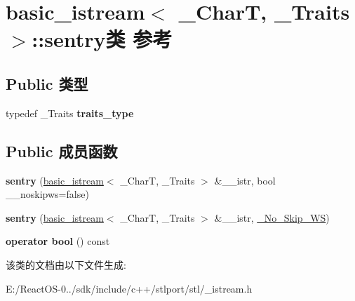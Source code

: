 \hypertarget{classbasic__istream_1_1sentry}{}\section{basic\+\_\+istream$<$ \+\_\+\+CharT, \+\_\+\+Traits $>$\+:\+:sentry类 参考}
\label{classbasic__istream_1_1sentry}
\subsection*{Public 类型}
\begin{DoxyCompactItemize}
\item 
\mbox{\label{classbasic__istream_1_1sentry_add21de8a23c3ec00ba2deb541eb53984}} 
typedef \+\_\+\+Traits {\bfseries traits\+\_\+type}
\end{DoxyCompactItemize}
\subsection*{Public 成员函数}
\begin{DoxyCompactItemize}
\item 
\mbox{\label{classbasic__istream_1_1sentry_a469ea3e67c901a6c3908ea6563baebe7}} 
{\bfseries sentry} (\hyperlink{classbasic__istream}{basic\+\_\+istream}$<$ \+\_\+\+CharT, \+\_\+\+Traits $>$ \&\+\_\+\+\_\+istr, bool \+\_\+\+\_\+noskipws=false)
\item 
\mbox{\label{classbasic__istream_1_1sentry_a5ec165167ee5a784d4d3c9c42df384f5}} 
{\bfseries sentry} (\hyperlink{classbasic__istream}{basic\+\_\+istream}$<$ \+\_\+\+CharT, \+\_\+\+Traits $>$ \&\+\_\+\+\_\+istr, \hyperlink{struct___no___skip___w_s}{\+\_\+\+No\+\_\+\+Skip\+\_\+\+WS})
\item 
\mbox{\label{classbasic__istream_1_1sentry_a80ad1e05f4815b5dc7a2abd9b0a11143}} 
{\bfseries operator bool} () const
\end{DoxyCompactItemize}


该类的文档由以下文件生成\+:\begin{DoxyCompactItemize}
\item 
E\+:/\+React\+O\+S-\/0../sdk/include/c++/stlport/stl/\+\_\+istream.\+h\end{DoxyCompactItemize}
